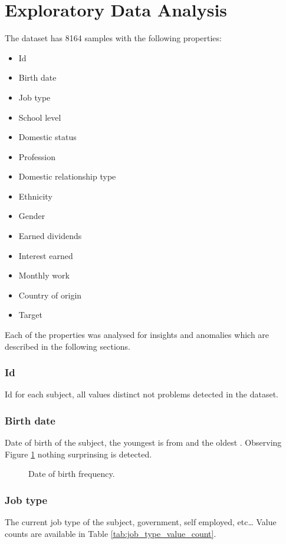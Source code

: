 \section{Exploratory Data Analysis}
\label{sec:eda}

The dataset has 8164 samples with the following properties:
\begin{itemize}
\item Id
\item Birth date
\item Job type
\item School level
\item Domestic status
\item Profession
\item Domestic relationship type
\item Ethnicity
\item Gender
\item Earned dividends
\item Interest earned
\item Monthly work
\item Country of origin
\item Target
\end{itemize}
Each of the properties was analysed for insights and anomalies which are
described in the following sections.

\subsubsection*{Id}
Id for each subject, all values distinct not problems detected in the
dataset.

\subsubsection*{Birth date}
Date of birth of the subject, the youngest is from
 and the oldest
.
Observing Figure \ref{fig:birth_date_freq} nothing surprinsing is detected.

\begin{figure}[ht]
    \caption{Date of birth frequency.}
    \label{fig:birth_date_freq}
    \centering
    
\end{figure}

\subsubsection*{Job type}
The current job type of the subject, government, self employed, etc\ldots
Value counts are available in Table \ref{tab:job_type_value_count}.


